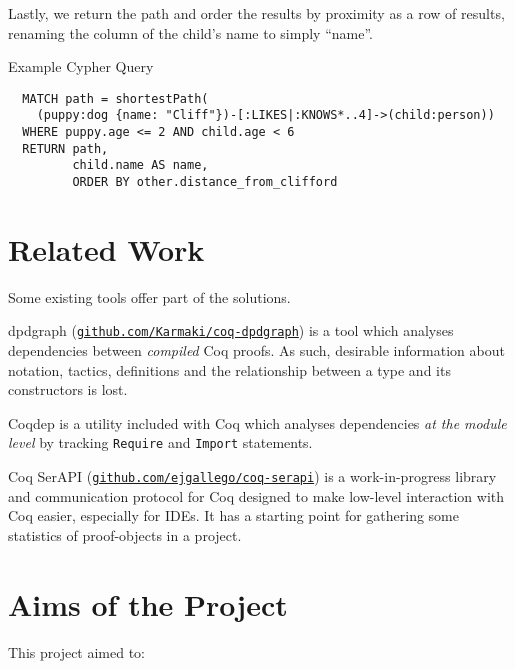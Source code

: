 Lastly, we return the path and order the results by proximity as a row of
results, renaming the column of the child's name to simply ``name''.

\begin{listing}[tb]%

\caption{Example Cypher Query}
\label{lst:cypherexample}

  \begin{verbatim}
  MATCH path = shortestPath(
    (puppy:dog {name: "Cliff"})-[:LIKES|:KNOWS*..4]->(child:person))
  WHERE puppy.age <= 2 AND child.age < 6
  RETURN path,
         child.name AS name,
         ORDER BY other.distance_from_clifford
  \end{verbatim}

\end{listing}

\section{Related Work}

Some existing tools offer part of the solutions.%

dpdgraph
(\href{http://github.com/Karmaki/coq-dpdgraph}{\texttt{github.com/Karmaki/coq-dpdgraph}})
is a tool which analyses dependencies between \emph{compiled} Coq proofs. As
such, desirable information about notation, tactics, definitions and the
relationship between a type and its constructors is lost.

Coqdep is a utility included with Coq which analyses dependencies \emph{at the
module level} by tracking {\tt Require} and {\tt Import} statements.

Coq SerAPI
(\href{http://github.com/ejgallego/coq-serapi}{\texttt{github.com/ejgallego/coq-serapi}})
is a work-in-progress library and communication protocol for Coq designed to
make low-level interaction with Coq easier, especially for IDEs. It has a
starting point for gathering some statistics of proof-objects in a project.

\section{Aims of the Project}\label{intro:aims}

This project aimed to:

